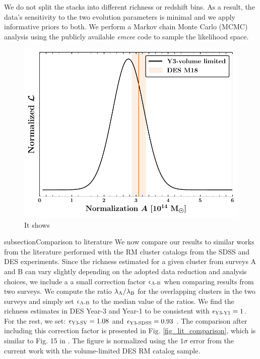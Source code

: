 We do not split the stacks into different richness or redshift bins.
As a result, the data's sensitivity to the two evolution parameters is minimal and we apply informative priors to both.
We perform a Markov chain Monte Carlo (MCMC) analysis %
using the publicly available \emph{emcee} \citep{mackey13} code to sample the likelihood space.
\begin{figure}
\includegraphics[width=\linewidth]{figs/M_rich_fitting_y3_v6_4_22_full_vl_JODY.pdf}
\caption{It shows}
\end{figure}
subsection{Comparison to literature}\label{subsec_lit_comparison}
We now compare our results to similar works from the literature performed with the RM cluster catalogs from the SDSS and DES experiments. 
Since the richness estimated for a given cluster from surveys A and B can vary slightly depending on the adopted data reduction and analysis choices, we include a a small correction factor $\epsilon_{\rm A{\text -}B}$ when comparing results from two surveys.
We compute the ratio $\lambda_{\rm A}/\lambda_{\rm B}$ for the overlapping clusters in the two surveys and simply set $\epsilon_{\rm A{\text -}B}$ to the median value of the ratios.
We find the richness estimates in DES Year-3 and Year-1 to be consistent with $\epsilon_{\rm Y3{\text -}Y1} = 1$. 
For the rest, we set: $\epsilon_{\rm Y3{\text -}SV} = 1.08$ and $\epsilon_{\rm Y3{\text -}SDSS} = 0.93$ .
The comparison after including this correction factor is presented in Fig. \ref{fig_lit_comparison}, which is similar to Fig. 15 in . 
The figure is normalized using the $1\sigma$ error from the current work with the \whichyear{} volume-limited DES RM catalog sample.

